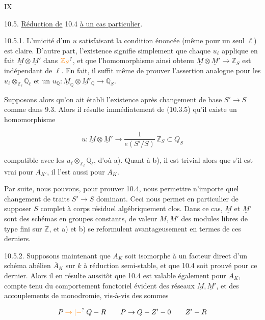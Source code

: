 \hfill IX

10.5. \uline{Réduction de} 10.4 \uline{à un cas particulier}.

10.5.1. L'unicité d'un $u$ satisfaisant la condition énoncée (même pour un seul $\ell$) est claire. D'autre part, l'existence signifie simplement que chaque $u_\ell$ applique en fait $\underline M\otimes\underline M'$ dans $\unsure{\mathbb Z_S}$, et que l'homomorphisme ainsi obtenu $\underline M\otimes\underline M'\longrightarrow\mathbb Z_S$ est indépendant de $\ell$. En fait, il suffit même de prouver l'assertion analogue pour les $u_\ell\otimes_{\mathbb Z_\ell}\mathbb Q_\ell$ et un $u_{\mathbb Q}:\underline M_{\mathbb Q}\otimes\underline M'_{\mathbb Q}\longrightarrow\mathbb Q_S$.

Supposons alors qu'on ait établi l'existence après changement de base $S'\longrightarrow S$ comme dans 9.3. Alors il résulte immédiatement de (10.3.5) qu'il existe un homomorphisme

\[
u:\underline M\otimes\underline M'\longrightarrow\frac{1}{e(S'/S)}\,\mathbb Z_S\subset Q_S
\]

compatible avec les $u_\ell\otimes_{\mathbb Z_\ell}\mathbb Q_\ell$, d'où a). Quant à b), il est trivial alors que s'il est vrai pour $A_{K'}$, il l'est aussi pour $A_K$.

Par suite, nous pouvons, pour prouver 10.4, nous permettre n'importe quel changement de traits $S'\longrightarrow S$ dominant. Ceci nous permet en particulier de supposer $S$ complet à corps résiduel algébriquement clos. Dans ce cas, $\underline M$ et $\underline M'$ sont des schémas en groupes constants, de valeur $M,M'$ des modules libres de type fini sur $\mathbb Z$, et a) et b) se reformulent avantageusement en termes de ces derniers.

10.5.2. Supposons maintenant que $A_K$ soit isomorphe à un facteur direct d'un schéma abélien $\bar A_K$ sur $k$ à réduction semi-stable, et que 10.4 soit prouvé pour ce dernier. Alors il en résulte aussitôt que 10.4 est valable également pour $A_K$, compte tenu du comportement fonctoriel évident des réseaux $\underline M,\underline M'$, et des accouplements de monodromie, vis-à-vis des sommes

\[
P\mathbin{\unsure{\to|-}} Q-R\qquad P\to Q-Z'-0\qquad Z'-R
\]

